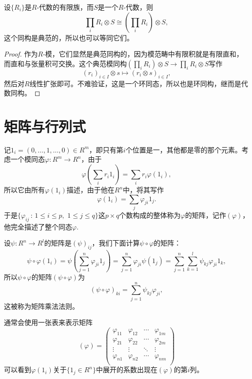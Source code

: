 \begin{pro}\label{prod_algebra_tensor}
	设$\{R_i\}$是$R$-代数的有限族，而$S$是一个$R$-代数，则
	\[
		\prod_i R_i\otimes S\cong \left(\prod_i R_i\right)\otimes S,
	\]
	这个同构是典范的，所以也可以等同它们。
\end{pro}

\begin{proof}
	作为$R$-模，它们显然是典范同构的，因为模范畴中有限积就是有限直和，而直和与张量积可交换。这个典范模同构$\left(\prod_i R_i\right)\otimes S\to \prod_i R_i\otimes S$写作
	\[
		(r_i)_{i\in I}\otimes s\mapsto (r_i\otimes s)_{i\in I},
	\]
	然后对$R$线性扩张即可。不难验证，这是一个环同态，所以也是环同构，继而是代数同构。
\end{proof}



\section{矩阵与行列式}

\para 记$1_i=(0,\dots,1,\dots,0)\in R^m$，即只有第$i$个位置是一，其他都是零的那个元素。考虑一个模同态$\varphi:R^m\to R^n$，由于
\[
	\varphi\left(\sum_{i} r_i1_i\right)=\sum_{i} r_i\varphi\left(1_i\right),
\]
所以它由所有$\varphi\left(1_i\right)$描述，由于他在$R^n$中，将其写作
\[
	\varphi\left(1_i\right)=\sum_{j}\varphi_{ji}1_j.
\]
于是$\{\varphi_{ij}\,:\, 1\leq i \leq p,\,\,1\leq j \leq q\}$这$p\times q$个数构成的整体称为$\varphi$的矩阵，记作$(\varphi)$，他完全描述了整个同态$\varphi$.

设$\psi:R^n\to R^l$的矩阵是$(\psi)_{ij}$，我们下面计算$\psi\circ\varphi$的矩阵：
\[
	\psi\circ\varphi(1_i)=\psi\left(\sum_{j=1}^n\varphi_{ji}1_j\right)=\sum_{j=1}^n\varphi_{ji}\psi(1_j)=\sum_{j=1}^n\sum_{k=1}^l\psi_{kj}\varphi_{ji}1_k,
\]
所以$\psi\circ\varphi$的矩阵$(\psi\circ\varphi)$为
\[
	(\psi\circ\varphi)_{ki}=\sum_{j=1}^n\psi_{kj}\varphi_{ji},
\]
这被称为矩阵乘法法则。

\para 通常会使用一张表来表示矩阵
\[
(\varphi)=
\begin{pmatrix}
	\varphi_{11} & \varphi_{12} & \cdots & \varphi_{1m}\\
	\varphi_{21} & \varphi_{22} & \cdots & \varphi_{2m}\\
	\vdots & \vdots & \ddots & \vdots \\
	\varphi_{n1} & \varphi_{n2} & \cdots & \varphi_{nm}\\
\end{pmatrix}
\]
可以看到$\varphi(1_i)$关于$\{1_j\in R^n\}$中展开的系数出现在$(\varphi)$的第$i$列。

